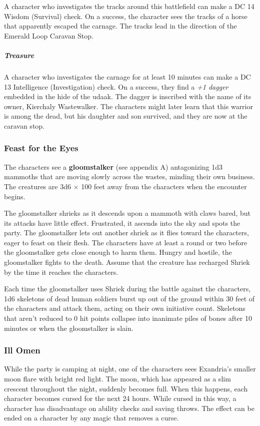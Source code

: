 \documentclass[10pt,a4paper,twoside,bg=print,twocolumn,openany,nodeprecatedcode]{dndbook}
\begin{document}
A character who investigates the tracks around this battlefield can make a DC 14 Wisdom (Survival) check. On a success, the character sees the tracks of a horse that apparently escaped the carnage. The tracks lead in the direction of the Emerald Loop Caravan Stop.

\subparagraph{Treasure}
A character who investigates the carnage for at least 10 minutes can make a DC 13 Intelligence (Investigation) check. On a success, they find a \textit{+1 dagger} embedded in the hide of the udaak. The dagger is inscribed with the name of its owner, Kierchaly Wastewalker. The characters might later learn that this warrior is among the dead, but his daughter and son survived, and they are now at the caravan stop.

\subsubsection{Feast for the Eyes}
The characters see a \textbf{gloomstalker} (see appendix A) antagonizing 1d3 mammoths that are moving slowly across the wastes, minding their own business. The creatures are 3d6 × 100 feet away from the characters when the encounter begins.

The gloomstalker shrieks as it descends upon a mammoth with claws bared, but its attacks have little effect. Frustrated, it ascends into the sky and spots the party. The gloomstalker lets out another shriek as it flies toward the characters, eager to feast on their flesh. The characters have at least a round or two before the gloomstalker gets close enough to harm them. Hungry and hostile, the gloomstalker fights to the death. Assume that the creature has recharged Shriek by the time it reaches the characters.

Each time the gloomstalker uses Shriek during the battle against the characters, 1d6 skeletons of dead human soldiers burst up out of the ground within 30 feet of the characters and attack them, acting on their own initiative count. Skeletons that aren't reduced to 0 hit points collapse into inanimate piles of bones after 10 minutes or when the gloomstalker is slain.

\subsubsection{Ill Omen}
While the party is camping at night, one of the characters sees Exandria's smaller moon flare with bright red light. The moon, which has appeared as a slim crescent throughout the night, suddenly becomes full. When this happens, each character becomes cursed for the next 24 hours. While cursed in this way, a character has disadvantage on ability checks and saving throws. The effect can be ended on a character by any magic that removes a curse.
\end{document}
